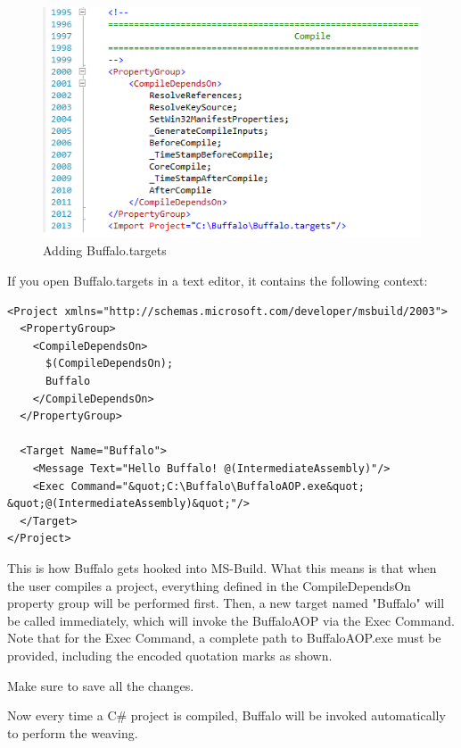 \begin{figure}[H]
  \includegraphics[scale=1.0]{CommonTarget.PNG}
  \centering
  \caption{Adding Buffalo.targets\label{buffalo_targets}}
\end{figure}

If you open Buffalo.targets in a text editor, it contains the following context:

\begin{lstlisting}[caption={Buffalo.targets}, label=buffalotargets, frame=tb, basicstyle=\scriptsize]
﻿<Project xmlns="http://schemas.microsoft.com/developer/msbuild/2003">
  <PropertyGroup>
    <CompileDependsOn>
      $(CompileDependsOn);
      Buffalo
    </CompileDependsOn>
  </PropertyGroup>

  <Target Name="Buffalo">
    <Message Text="Hello Buffalo! @(IntermediateAssembly)"/>
    <Exec Command="&quot;C:\Buffalo\BuffaloAOP.exe&quot; &quot;@(IntermediateAssembly)&quot;"/>
  </Target>
</Project>
\end{lstlisting}

This is how Buffalo gets hooked into MS-Build. What this means is that when the user compiles a project, everything defined in the CompileDependsOn property group will be performed first. Then, a new target named "Buffalo" will be called immediately, which will invoke the BuffaloAOP via the Exec Command. Note that for the Exec Command, a complete path to BuffaloAOP.exe must be provided, including the encoded quotation marks as shown.

Make sure to save all the changes. 

Now every time a C\# project is compiled, Buffalo will be invoked automatically to perform the weaving.
